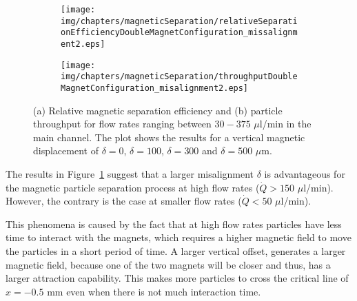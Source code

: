 \begin{figure}[htb]
        \centering
        \begin{subfigure}[b]{0.48\textwidth}
                \texttt{[image: img/chapters/magneticSeparation/relativeSeparationEfficiencyDoubleMagnetConfiguration\_missalignment2.eps]}
                \caption{}  
        \end{subfigure}
        \begin{subfigure}[b]{0.48\textwidth}
                \texttt{[image: img/chapters/magneticSeparation/throughputDoubleMagnetConfiguration\_misalignment2.eps]}
                \caption{}                
        \end{subfigure}
        \caption[Relative magnetic separation efficiency and particle throughput when fluidic channel has a displacement between the two magnets of the double magnet configuration]{(a) Relative magnetic separation efficiency and (b) particle throughput for flow rates ranging between $30-375$ $\mu$l/min in the main channel. The plot shows the results for a vertical magnetic displacement of $\delta=0$, $\delta=100$, $\delta=300$ and $\delta=500$ $\mu$m.}
        \label{fig:relativeSeparationEfficiencyAndParticleThroughputDoubleMagnetConfigurationMagnetOffset}
\end{figure}

The results in Figure~\ref{fig:relativeSeparationEfficiencyAndParticleThroughputDoubleMagnetConfigurationMagnetOffset} suggest that a larger misalignment $\delta$ is advantageous for the magnetic particle separation process at high flow rates ($\dot{Q} > 150$ $\mu$l/min). However, the contrary is the case at smaller flow rates ($\dot{Q} < 50$ $\mu$l/min).

This phenomena is caused by the fact that at high flow rates particles have less time to interact with the magnets, which requires a higher magnetic field to move the particles in a short period of time. A larger vertical offset, generates a larger magnetic field, because one of the two magnets will be closer and thus, has a larger attraction capability. This makes more particles to cross the critical line of $x=-0.5$ mm even when there is not much interaction time. 


